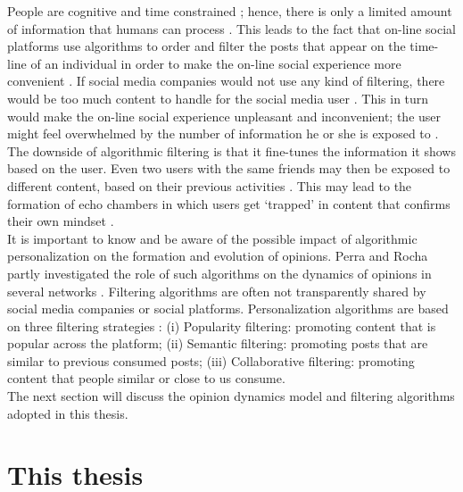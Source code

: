 \documentclass[11 pt , letterpaper , twoside , openright]{book}
\begin{document}
People are cognitive and time constrained \cite{Perra2019}; hence, there is only a limited amount of information that humans can process \cite{Bozdag2013}. This leads to the fact that on-line social platforms use algorithms to order and filter the posts that appear on the time-line of an individual in order to make the on-line social experience more convenient \cite{Perra2019}. If social media companies would not use any kind of filtering, there would be too much content to handle for the social media user \cite{Bozdag2013}. This in turn would make the on-line social experience unpleasant and inconvenient; the user might feel overwhelmed by the number of information he or she is exposed to \cite{Bozdag2013}. \\
\newline
The downside of algorithmic filtering is that it fine-tunes the information it shows based on the user. Even two users with the same friends may then be exposed to different content, based on their previous activities \cite{Bozdag2013}. This may lead to the formation of echo chambers in which users get `trapped' in content that confirms their own mindset \cite{Bozdag2013}. \\
\newline
It is important to know and be aware of the possible impact of algorithmic personalization on the formation and evolution of opinions. Perra and Rocha partly investigated the role of such algorithms on the dynamics of opinions in several networks \cite{Perra2019}. Filtering algorithms are often not transparently shared by social media companies or social platforms. Personalization algorithms are based on three filtering strategies \cite{Perra2019}: (i) Popularity filtering: promoting content that is popular across the platform; (ii) Semantic filtering: promoting posts that are similar to previous consumed posts; (iii) Collaborative filtering: promoting content that people similar or close to us consume.\\ 
\newline
The next section will discuss the opinion dynamics model and filtering algorithms adopted in this thesis.

\section{This thesis}\label{modelThesis}
\end{document}
